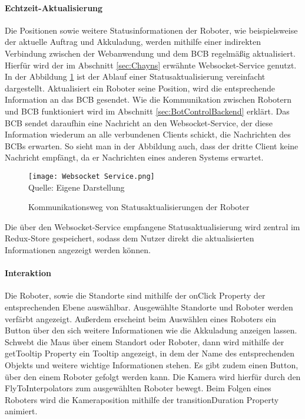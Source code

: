 \paragraph{Echtzeit-Aktualisierung}
Die Positionen sowie weitere Statusinformationen der Roboter, wie beispielsweise der aktuelle Auftrag und Akkuladung, werden mithilfe einer indirekten Verbindung zwischen der Webanwendung und dem \ac{BCB} regelmäßig aktualisiert. Hierfür wird der im Abschnitt \ref{sec:Chayns} erwähnte \gls{Websocket}-Service genutzt. In der Abbildung \ref{fig:RobotStatusUpdate} ist der Ablauf einer Statusaktualisierung vereinfacht dargestellt. Aktualisiert ein Roboter seine Position, wird die entsprechende Information an das \ac{BCB} gesendet. Wie die Kommunikation zwischen Robotern und \ac{BCB} funktioniert wird im Abschnitt \ref{sec:BotControlBackend} erklärt.
Das \ac{BCB} sendet daraufhin eine Nachricht an den \gls{Websocket}-Service, der diese Information wiederum an alle verbundenen Clients schickt, die Nachrichten des \ac{BCB}s erwarten. So sieht man in der Abbildung auch, dass der dritte Client keine Nachricht empfängt, da er Nachrichten eines anderen Systems erwartet.

\begin{figure}[H]
    \centering
    \caption[]{Kommunikationsweg von Statusaktualisierungen der Roboter}\label{fig:RobotStatusUpdate}
    \texttt{[image: Websocket Service.png]}
    \\
    Quelle: Eigene Darstellung
\end{figure}

Die über den \gls{Websocket}-Service empfangene Statusaktualisierung wird zentral im Redux-Store gespeichert, sodass dem Nutzer direkt die aktualisierten Informationen angezeigt werden können.

\paragraph{Interaktion}
Die Roboter, sowie die Standorte sind mithilfe der onClick Property der entsprechenden Ebene \cite{DeckglInteractivity} auswählbar. Ausgewählte Standorte und Roboter werden verfärbt angezeigt. Außerdem erscheint beim Auswählen eines Roboters ein Button über den sich weitere Informationen wie die Akkuladung anzeigen lassen. Schwebt die Maus über einem Standort oder Roboter, dann wird mithilfe der getTooltip Property \cite{DeckglDeckClass} ein Tooltip angezeigt, in dem der Name des entsprechenden Objekts und weitere wichtige Informationen stehen. Es gibt zudem einen Button, über den einem Roboter gefolgt werden kann. Die Kamera wird hierfür durch den FlyToInterpolators \cite{DeckglFlyToInterpolator} zum ausgewählten Roboter bewegt. Beim Folgen eines Roboters wird die Kameraposition mithilfe der transitionDuration Property \cite{DeckglAnimationsAndTransitions} animiert.


